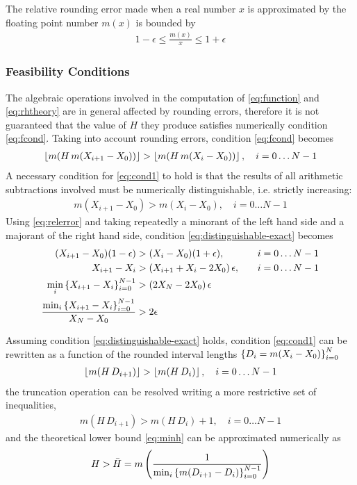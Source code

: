 \documentclass[preprint,1p,times]{elsarticle}
\begin{document}
The relative rounding error made when a real number $x$ is approximated by the floating point number $m(x)$ is bounded by
\begin{align}
\label{eq:relerror}
1-\epsilon \leq \frac{m(x)}{x} \leq 1+\epsilon
\end{align}

\subsubsection{Feasibility Conditions}
The algebraic operations involved in the computation of \eqref{eq:function} and \eqref{eq:rhtheory} are in general affected by rounding errors, therefore it is not guaranteed that the value of $H$ they produce satisfies numerically condition \eqref{eq:fcond}.
Taking into account rounding errors, condition \eqref{eq:fcond} becomes
\begin{align}
\label{eq:cond1}
	 \left \lfloor  m(H\, m(X_{i+1}-X_0))  \right \rfloor >  \left \lfloor  m(H\, m(X_{i}-X_0))  \right \rfloor, \quad i=0\dots N-1
\end{align}
A necessary condition for \eqref{eq:cond1} to hold is that the results of all arithmetic subtractions involved must be numerically distinguishable, i.e. strictly increasing:
\begin{align}
\label{eq:distinguishable-exact}
	m(X_{i+1}-X_0) > m(X_{i}-X_0),   \quad i=0\dots N-1
\end{align}
Using \eqref{eq:relerror} and taking repeatedly a minorant of the left hand side and a majorant of the right hand side, condition \eqref{eq:distinguishable-exact} becomes
\begin{align}
	 (X_{i+1}-X_0)(1-\epsilon) &> (X_{i}-X_0)(1+\epsilon) ,   &&\quad i=0\dots N-1 \notag\\
	X_{i+1}-X_i &> (X_{i+1}+X_{i}-2X_0)\,\epsilon ,   &&\quad i=0\dots N-1 \notag \\
	\min_i\left \{ X_{i+1}-X_i \right \}_{i=0}^{N-1} &> (2X_N-2X_0)\,\epsilon  \notag \\
\label{eq:distinguishable-approx}
	 \dfrac{ \min_i\left \{ X_{i+1}-X_i \right \}_{i=0}^{N-1} }{X_{N}-X_0} &>2\epsilon
\end{align}

Assuming condition \eqref{eq:distinguishable-exact} holds, condition \eqref{eq:cond1} can be rewritten as a function of the rounded interval lengths $\left \{ D_i=m(X_i-X_0) \right \}_{i=0}^N$
\begin{align}
\label{eq:cond2}
	 \left \lfloor  m(H\, D_{i+1})  \right \rfloor >  \left \lfloor  m(H\, D_i)  \right \rfloor, \quad i=0\dots N-1
\end{align}
the truncation operation can be resolved writing a more restrictive set of inequalities, 
\begin{align}
\label{eq:cond3}
	 m(H\, D_{i+1}) >  m(H\, D_i) + 1, \quad i=0\dots N-1
\end{align}
and the theoretical lower bound \eqref{eq:minh} can be approximated numerically as 
\begin{align}
\label{eq:minhnumeric}
	H > \bar{H}
		= m\left(\frac{1}{\min_i\left \{ m(D_{i+1}-D_{i}) \right \}_{i=0}^{N-1}}\right)
\end{align}
\end{document}
